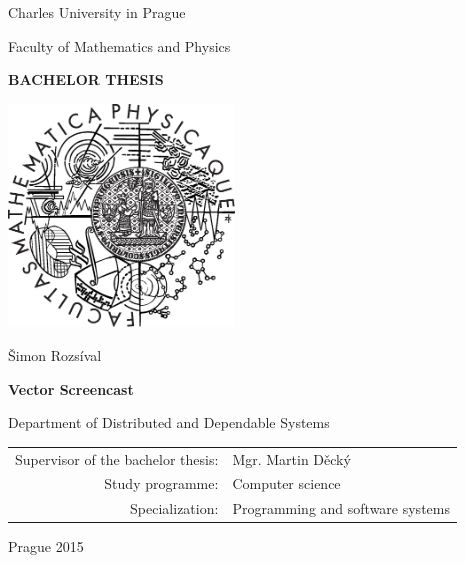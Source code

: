 \documentclass[12pt,a4paper]{report}
\begin{document}


\pagestyle{empty}
\begin{center}

\large

Charles University in Prague

\medskip

Faculty of Mathematics and Physics

\vfill

{\bf\Large BACHELOR THESIS}

\vfill

\centerline{\mbox{\includegraphics[width=60mm]{../img/logo.eps}}}

\vfill
\vspace{5mm}

{\LARGE Šimon Rozsíval}

\vspace{15mm}

{\LARGE\bfseries Vector Screencast}

\vfill

Department of Distributed and Dependable Systems

\vfill

\begin{tabular}{rl}

Supervisor of the bachelor thesis: & Mgr. Martin Děcký \\
\noalign{\vspace{2mm}}
Study programme: & Computer science \\
\noalign{\vspace{2mm}}
Specialization: & Programming and software systems \\
\end{tabular}

\vfill

Prague 2015

\end{center}
\end{document}
